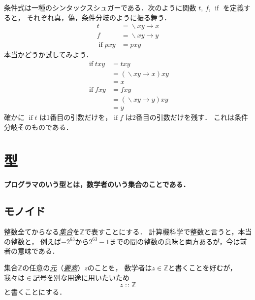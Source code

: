\documentclass[a5paper,draft]{jsbook}
\newenvironment{leader}{\begingroup\bf}{\endgroup}
\newcommand{\keyword}[1]{{\underline{\emph{#1}}}}
\newcommand{\mathSpecialSet}[1]{\mathbb{#1}} %
\newcommand{\mathUnaryOperator}[1]{\operatorname{#1}}
\newcommand{\mathLambda}{\mathUnaryOperator{\backslash}}
\newcommand{\mathBinaryOperator}[1]{\operatorname{#1}}
\newcommand{\mathIn}{\mathBinaryOperator{:\!:}}
\newcommand{\mathLambdaArrow}{\rightarrow}
\newcommand{\mathSpecialFunction}[1]{\operatorname{\mathrm{#1}}}
\newcommand{\mathIfFunc}{\mathSpecialFunction{if}}
\newcommand{\mathLambdaExpression}[2]{\mathLambda#1\mathLambdaArrow#2}
\begin{document}
条件式は一種のシンタックスシュガーである．次のように関数 $t$, $f$, $\mathIfFunc$ を定義すると，
それぞれ真，偽，条件分岐のように振る舞う．
\begin{align}
t&=\mathLambdaExpression{xy}{x}\\
f&=\mathLambdaExpression{xy}{y}\\
\mathIfFunc pxy&=pxy
\end{align}
本当かどうか試してみよう．
\begin{align}
\mathIfFunc txy&=txy\\
&=\left(\mathLambdaExpression{xy}{x}\right)xy\\
&=x\\
\mathIfFunc fxy&=fxy\\
&=\left(\mathLambdaExpression{xy}{y}\right)xy\\
&=y
\end{align}
確かに $\mathIfFunc t$ は1番目の引数だけを，$\mathIfFunc f$ は2番目の引数だけを残す．
これは条件分岐そのものである．


\chapter{型}

\begin{leader}
プログラマのいう型とは，数学者のいう集合のことである．
\end{leader}

\section{モノイド}

整数全てからなる\keyword{集合}を$\mathSpecialSet{Z}$で表すことにする．
計算機科学で整数と言うと，本当の整数と，
例えば$-2^{63}$から$2^{63}-1$までの間の整数の意味と両方あるが，今は前者の意味である．

集合$\mathSpecialSet{Z}$の任意の\keyword{元}（\keyword{要素}）$z$のことを，
数学者は$z\in\mathSpecialSet{Z}$と書くことを好むが，
我々は$\in$記号を別な用途に用いたいため
\begin{equation}
\label{eq:totality}
z\mathIn\mathSpecialSet{Z}
\end{equation}
と書くことにする．
\end{document}
